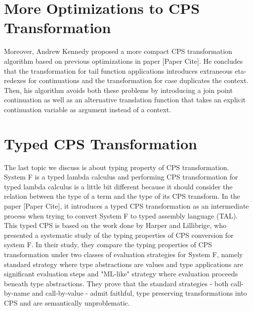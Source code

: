 \section{More Optimizations to CPS Transformation}

Moreover, Andrew Kennedy proposed a more compact CPS transformation algorithm based on previous optimizations in paper [Paper Cite]. He concludes that the transformation for tail function applications introduces extraneous eta-redexes for continuations and the transformation for case duplicates the context. Then, his algorithm avoids both these problems by introducing a join point continuation as well as an alternative translation function that takes an explicit continuation variable as argument instead of a context.

\section{Typed CPS Transformation}

The last topic we discuss is about typing property of CPS transformation. System F is a typed lambda calculus and performing CPS transformation for typed lambda calculus is a little bit different because it should consider the relation between the type of a term and the type of its CPS transform. In the paper [Paper Cite], it introduces a typed CPS transformation as an intermediate process when trying to convert System F to typed assembly language (TAL). This typed CPS is based on the work done by Harper and Lillibrige, who presented a systematic study of the typing properties of CPS conversion for system F. In their study, they compare the typing properties of CPS transformation under two classes of evaluation strategies for System F, namely standard strategy where type abstractions are values and type applications are significant evaluation steps and "ML-like" strategy where evaluation proceeds beneath type abstractions. They prove that the standard strategies - both call-by-name and call-by-value - admit faithful, type preserving transformations into CPS and are semantically unproblematic.

